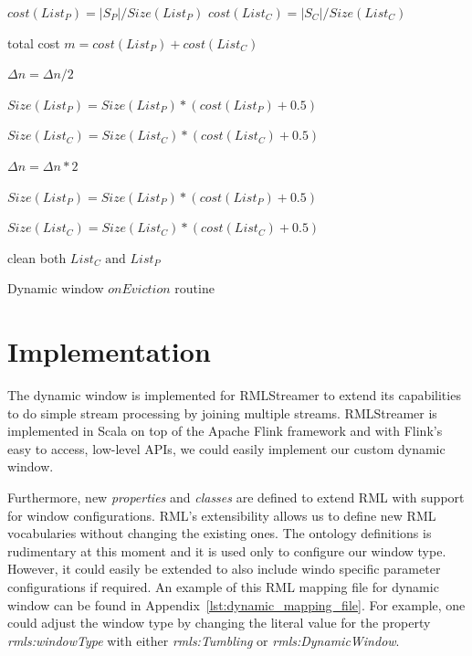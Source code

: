 \begin{algorithm}[htbp]
    \DontPrintSemicolon

    $cost(List_P) = |S_P| / Size(List_P)$       
    $cost(List_C) = |S_C| / Size(List_C)$       


    total cost $ m = cost(List_P) + cost(List_C)$  
  
    {
        $\Delta n = \Delta n / 2 $ 
        
        $Size(List_P) = Size(List_P) * (cost(List_P) + 0.5)$  

        $Size(List_C) = Size(List_C) * (cost(List_C) + 0.5)$  
    }
    {
        $\Delta n = \Delta n * 2$ 

        $Size(List_P) = Size(List_P) * (cost(List_P) + 0.5)$  

        $Size(List_C) = Size(List_C) * (cost(List_C) + 0.5)$  
    }

    clean both $List_C \text{ and } List_P$
    \caption{Dynamic window $onEviction$ routine}
    \label{alg:dynamic_eviction}
\end{algorithm}



\section{Implementation}%
\label{sec:Implementation}

The dynamic window is implemented for RMLStreamer 
to extend its capabilities to do simple stream processing by 
joining multiple streams. RMLStreamer is implemented in Scala 
on top of the Apache Flink framework and with Flink's easy to access, low-level APIs, 
we could easily implement our custom dynamic window.  

Furthermore, new \emph{properties} and \emph{classes} are defined to extend RML with 
support for window configurations. RML's extensibility allows us to 
define new RML vocabularies without changing the existing ones. The ontology 
definitions is rudimentary at this moment and it is used only to configure our 
window type. However, it could easily be extended to also include windo specific 
parameter configurations if required. An example of this RML mapping file for 
dynamic window can 
be found in Appendix~\ref{lst:dynamic_mapping_file}. For example, one could 
adjust the window type by changing the literal value for the property 
\emph{rmls:windowType} with either \emph{rmls:Tumbling} or \emph{rmls:DynamicWindow}. 








 





